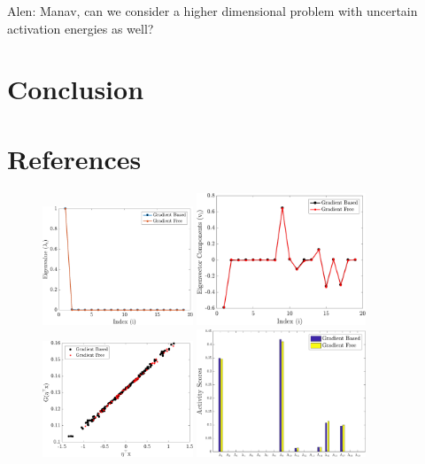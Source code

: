 \documentclass[1pt]{elsarticle}
\newcommand{\alennote}[1]{{\color{blue} Alen: {#1}}}
\begin{document}
\alennote{Manav, can we consider a higher dimensional problem with uncertain
activation energies as well?}

\section{Conclusion}

\section*{References}



\begin{figure}[htbp]
 \begin{center}
  \includegraphics[width=0.40\textwidth]{./Figures/comp_eig}
\hspace{1mm}
  \includegraphics[width=0.45\textwidth]{./Figures/comp_eigv}
  \\ \vspace{5mm}
  \includegraphics[width=0.40\textwidth]{./Figures/comp_ssp}
\hspace{1mm}
  \includegraphics[width=0.45\textwidth]{./Figures/comp_as}

\end{center}
\end{figure}
\end{document}
